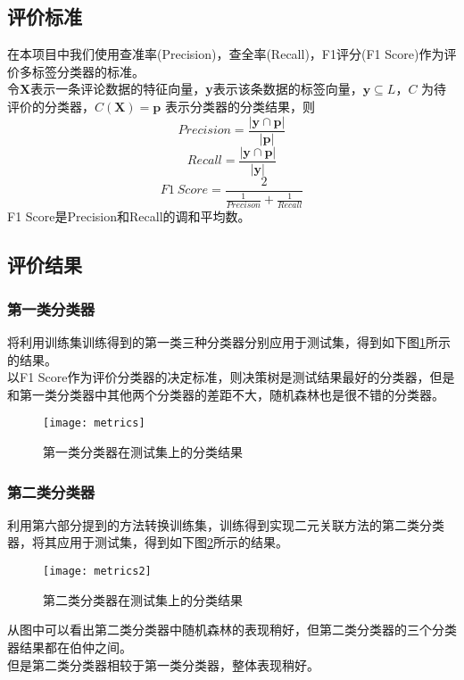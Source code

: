 \documentclass[a4paper, twocolumn]{article}
\begin{document}
\begin{CJK}{UTF8}{gbsn}
	\subsection{评价标准}
	在本项目中我们使用查准率(Precision)，查全率(Recall)，F1评分(F1 Score)作为评价多标签分类器的标准\cite{metrics}。\\
	令\textbf{X}表示一条评论数据的特征向量，\textbf{y}表示该条数据的标签向量，$ \textbf{y} \subseteq L $，$ C $ 为待评价的分类器，$ C(\textbf{X}) = \textbf{p} $ 表示分类器的分类结果，则
	\begin{equation}
	Precision = \frac{|\textbf{y} \cap \textbf{p}|}{|\textbf{p}|}
	\end{equation}
	\begin{equation}
	Recall = \frac{|\textbf{y} \cap \textbf{p}|}{|\textbf{y}|}
	\end{equation}
	\begin{equation}
	F1 \ Score = \frac{2}{\frac{1}{Precison}+\frac{1}{Recall}}
	\end{equation}
	F1 Score是Precision和Recall的调和平均数。
	\subsection{评价结果}
	\subsubsection{第一类分类器}
	将利用训练集训练得到的第一类三种分类器分别应用于测试集，得到如下图\ref{fig:metrics}所示的结果。\\
	以F1 Score作为评价分类器的决定标准，则决策树是测试结果最好的分类器，但是和第一类分类器中其他两个分类器的差距不大，随机森林也是很不错的分类器。
	\begin{figure}[h]
	\centering
	\texttt{[image: metrics]}
	\caption{第一类分类器在测试集上的分类结果}
	\label{fig:metrics}
	\end{figure}
	\subsubsection{第二类分类器}
	利用第六部分提到的方法转换训练集，训练得到实现二元关联方法的第二类分类器，将其应用于测试集，得到如下图\ref{fig:metrics2}所示的结果。
	\begin{figure}[h]
	\centering
	\texttt{[image: metrics2]}
	\caption{第二类分类器在测试集上的分类结果}
	\label{fig:metrics2}
	\end{figure}
	\newline
	从图中可以看出第二类分类器中随机森林的表现稍好，但第二类分类器的三个分类器结果都在伯仲之间。\\
	但是第二类分类器相较于第一类分类器，整体表现稍好。

\end{CJK}
\end{document}
